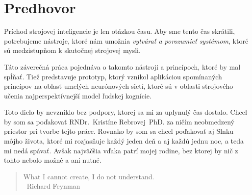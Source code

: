 \chapter{Predhovor}

Príchod strojovej inteligencie je len otázkou času. Aby sme tento čas skrátili, potrebujeme nástroje, ktoré nám umožnia \emph{vytvárať a porozumieť systémom}, ktoré sú medzistupňom k skutočnej strojovej mysli.

Táto záverečná práca pojednáva o takomto nástroji a princípoch, ktoré by mal spĺňať. Tiež predstavuje prototyp, ktorý vznikol aplikáciou spomínaných princípov na oblasť umelých neurónových sietí, ktoré sú v oblasti strojového učenia najperspektívnejší model ľudskej kognície.

\bigskip

Toto dielo by nevzniklo bez podpory, ktorej sa mi za uplynulý čas dostalo. Chcel by som sa poďakovať RNDr.~Kristíne Rebrovej~PhD. za ničím neobmedzený priestor pri tvorbe tejto práce. Rovnako by som sa chcel poďakovať aj Slnku môjho života, ktoré mi rozjasňuje každý jeden deň a aj každú jednu noc, a teda mi nedá spávať. Avšak najväčšia vďaka patrí mojej rodine, bez ktorej by nič z tohto nebolo možné a ani nutné.

\vfill

\begin{quote}
\Large
What I cannot create, I do not understand.\\
\mbox{}~\hfill \large Richard Feynman
\end{quote}


\vfill
